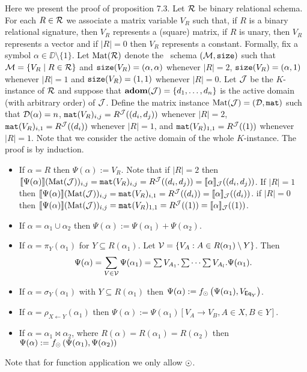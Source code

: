 Here we present the proof of proposition 7.3.
Let $\mathcal{R}$ be binary relational schema. For each $R\in \mathcal{R}$ we associate a matrix variable 
$V_R$ such that, if $R$ is a binary relational signature, then $V_R$ represents a (square) matrix, 
if $R$ is unary, then $V_R$ represents a vector and if $|R|=0$ then $V_R$ represents a constant. Formally, 
fix a symbol $\alpha \in \DD \setminus \{1\}$. Let $\text{Mat}(\mathcal{R})$ denote the \lang \ schema
$(\mathcal{M},\texttt{size})$ such that $\mathcal{M} = \{ V_R \mid R \in \mathcal{R}\}$ and $\texttt{size}(V_R) = (\alpha, \alpha)$ 
whenever $|R| = 2$, $\texttt{size}(V_R) = (\alpha, 1)$ whenever $|R|=1$ and $\texttt{size}(V_R) = (1, 1)$ whenever $|R|=0$. 
Let $\mathcal{J}$ be the $K$-instance of $\mathcal{R}$ and suppose that $\mathbf{adom}(\mathcal{J}) = \{d_1, \ldots, d_n\}$ is 
the active domain (with arbitrary order) of $\mathcal{J}$. 
Define the matrix instance $\text{Mat}(\mathcal{J}) = (\mathcal{D},\texttt{mat})$ such 
that $\mathcal{D}(\alpha) = n$, $\texttt{mat}(V_R)_{i,j} = R^{\mathcal{J}}((d_i, d_j))$ whenever $|R|=2$, $\texttt{mat}(V_R)_{i,1} = R^{\mathcal{J}}((d_i))$ 
whenever $|R|=1$, and $\texttt{mat}(V_R)_{1,1} = R^{\mathcal{J}}((1))$ whenever $|R|=1$. 
Note that we consider the active domain of the whole $K$-instance.
The proof is by induction.

\begin{itemize}
  \item If $\alpha = R$ then $\Psi (\alpha):=V_R$. Note that if $|R|=2$ then 
    $\llbracket \Psi(\alpha) \rrbracket(\text{Mat}(\mathcal{J}))_{i,j}=\texttt{mat}(V_R)_{i,j} = R^{\mathcal{J}}((d_i, d_j))=\llbracket \alpha \rrbracket_{\mathcal{J}}((d_i, d_j))$. If $|R|=1$ then 
    $\llbracket \Psi(\alpha) \rrbracket(\text{Mat}(\mathcal{J}))_{i,j}=\texttt{mat}(V_R)_{i,1} = R^{\mathcal{J}}((d_i))=\llbracket \alpha \rrbracket_{\mathcal{J}}((d_i))$. if $|R|=0$ then 
    $\llbracket \Psi(\alpha) \rrbracket(\text{Mat}(\mathcal{J}))_{i,j}=\texttt{mat}(V_R)_{1,1} = R^{\mathcal{J}}((1))=\llbracket \alpha \rrbracket_{\mathcal{J}}((1))$.
  \item If $\alpha=\alpha_1\cup\alpha_2$ then $\Psi(\alpha):=\Psi(\alpha_1)+\Psi(\alpha_2)$.
  \item If $\alpha = \pi_{Y}(\alpha_1)$ for $Y\subseteq R(\alpha_1)$. Let $\mathcal{V} = \lbrace V_A:A\in R(\alpha_1)\setminus Y \rbrace$. 
    Then
    $$
    \Psi(\alpha) = \sum_{V\in\mathcal{V}} \Psi(\alpha_1) = \textstyle\sum V_{A_1}. \textstyle\sum \cdots \textstyle\sum V_{A_{l}}. \Psi(\alpha_1).
    $$
  \item If $\alpha = \sigma_Y(\alpha_1)$ with $Y\subseteq R(\alpha_1)$ then 
    $\Psi(\alpha):=f_{\odot}\left( \Psi(\alpha_1), V_{\mathsf{Eq}_Y} \right)$.
  \item If $\alpha = \rho_{X\leftarrow Y}(\alpha_1)$ then $\Psi (\alpha):= \Psi (\alpha_1)\left[ V_A\rightarrow V_B, A\in X, B\in Y \right]$.
  \item If $\alpha = \alpha_1\Join \alpha_2$, where $R(\alpha)=R(\alpha_1)=R(\alpha_2)$ then 
    $\Psi (\alpha):=f_{\odot}\left( \Psi (\alpha_1), \Psi (\alpha_2) \right)$
\end{itemize}

Note that for function application we only allow $\odot$.